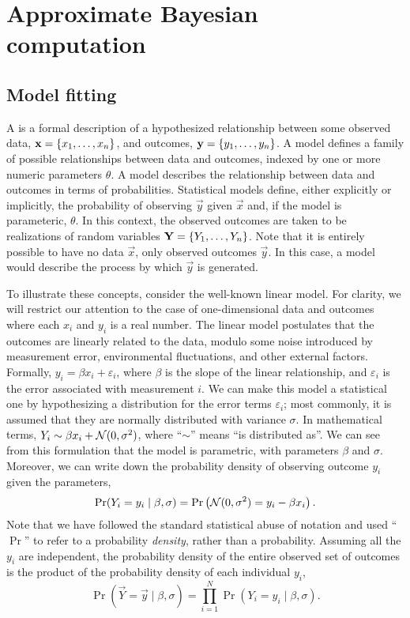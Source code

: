 \section{Approximate Bayesian computation}
\label{sec:abc}

\subsection{Model fitting}

A  is a formal description of a hypothesized
relationship between some observed data, $\mathbf{x} = \left\lbrace x_1, \ldots, x_n\right\rbrace$,
and outcomes, $\mathbf{y} = \left\lbrace y_1, \ldots, y_n\right\rbrace$. A  model
defines a family of possible relationships between data and outcomes, indexed
by one or more numeric parameters $\theta$. A  model
describes the relationship between data and outcomes in terms of probabilities.
Statistical models define, either explicitly or implicitly, the probability of
observing $\vec{y}$ given $\vec{x}$ and, if the model is parameteric, $\theta$.
In this context, the observed outcomes are taken to be realizations of random
variables $\mathbf{Y} = \left\lbrace Y_1, \ldots, Y_n\right\rbrace$. Note that it is entirely possible
to have no data $\vec{x}$, only observed outcomes $\vec{y}$. In this case, a
model would describe the process by which $\vec{y}$ is generated.

To illustrate these concepts, consider the well-known linear model. For
clarity, we will restrict our attention to the case of one-dimensional data and
outcomes where each $x_i$ and $y_i$ is a real number. The linear model
postulates that the outcomes are linearly related to the data, modulo some
noise introduced by measurement error, environmental fluctuations, and other
external factors. Formally, $y_i = \beta x_i + \varepsilon_i$, where $\beta$ is
the slope of the linear relationship, and $\varepsilon_i$ is the error
associated with measurement $i$. We can make this model a statistical one by
hypothesizing a distribution for the error terms $\varepsilon_i$; most
commonly, it is assumed that they are normally distributed with variance
$\sigma$. In mathematical terms, $Y_i \sim \beta x_i + \mathcal{N}(0, \sigma^2)$, where
``$\sim$'' means ``is distributed as''. We can see from this formulation that
the model is parametric, with parameters $\beta$ and $\sigma$. Moreover, we can
write down the probability density of observing outcome $y_i$ given the
parameters,
\[
  \Pr(Y_i = y_i \mid \beta, \sigma) = 
  \Pr\left(\mathcal{N}(0, \sigma^2) = y_i - \beta x_i\right).
\]
Note that we have followed the standard statistical abuse of notation and used
``$\Pr$'' to refer to a probability \emph{density}, rather than a probability.
Assuming all the $y_i$ are independent, the probability density of the entire
observed set of outcomes is the product of the probability density of each
individual $y_i$,
\[
  \Pr(\vec{Y} = \vec{y} \mid \beta, \sigma) = 
  \prod_{i=1}^N \Pr(Y_i = y_i \mid \beta, \sigma).
\]

